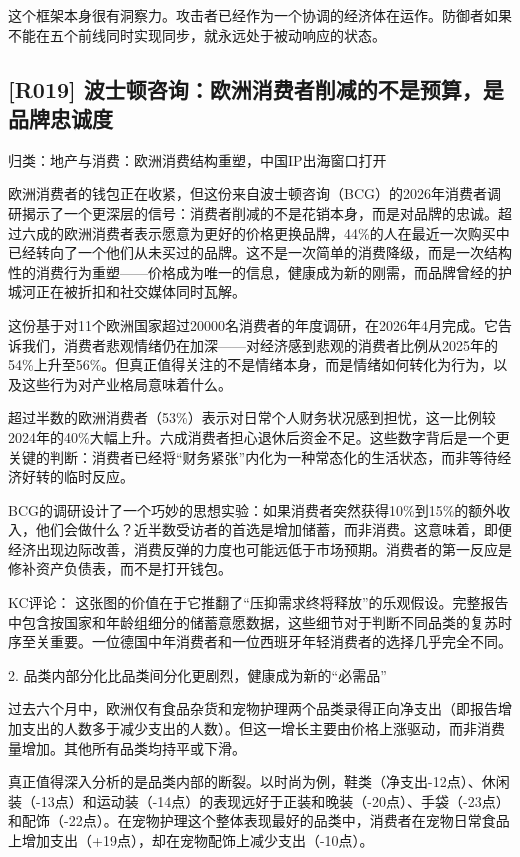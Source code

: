 \documentclass[11pt]{ctexart}
\begin{document}
这个框架本身很有洞察力。攻击者已经作为一个协调的经济体在运作。防御者如果不能在五个前线同时实现同步，就永远处于被动响应的状态。

\subsection{[R019] 波士顿咨询：欧洲消费者削减的不是预算，是品牌忠诚度}
{\small\color{refgray}归类：地产与消费：欧洲消费结构重塑，中国IP出海窗口打开}

欧洲消费者的钱包正在收紧，但这份来自波士顿咨询（BCG）的2026年消费者调研揭示了一个更深层的信号：消费者削减的不是花销本身，而是对品牌的忠诚。超过六成的欧洲消费者表示愿意为更好的价格更换品牌，44\%的人在最近一次购买中已经转向了一个他们从未买过的品牌。这不是一次简单的消费降级，而是一次结构性的消费行为重塑——价格成为唯一的信息，健康成为新的刚需，而品牌曾经的护城河正在被折扣和社交媒体同时瓦解。

这份基于对11个欧洲国家超过20000名消费者的年度调研，在2026年4月完成。它告诉我们，消费者悲观情绪仍在加深——对经济感到悲观的消费者比例从2025年的54\%上升至56\%。但真正值得关注的不是情绪本身，而是情绪如何转化为行为，以及这些行为对产业格局意味着什么。

超过半数的欧洲消费者（53\%）表示对日常个人财务状况感到担忧，这一比例较2024年的40\%大幅上升。六成消费者担心退休后资金不足。这些数字背后是一个更关键的判断：消费者已经将“财务紧张”内化为一种常态化的生活状态，而非等待经济好转的临时反应。

BCG的调研设计了一个巧妙的思想实验：如果消费者突然获得10\%到15\%的额外收入，他们会做什么？近半数受访者的首选是增加储蓄，而非消费。这意味着，即便经济出现边际改善，消费反弹的力度也可能远低于市场预期。消费者的第一反应是修补资产负债表，而不是打开钱包。

KC评论： 这张图的价值在于它推翻了“压抑需求终将释放”的乐观假设。完整报告中包含按国家和年龄组细分的储蓄意愿数据，这些细节对于判断不同品类的复苏时序至关重要。一位德国中年消费者和一位西班牙年轻消费者的选择几乎完全不同。

2. 品类内部分化比品类间分化更剧烈，健康成为新的“必需品”

过去六个月中，欧洲仅有食品杂货和宠物护理两个品类录得正向净支出（即报告增加支出的人数多于减少支出的人数）。但这一增长主要由价格上涨驱动，而非消费量增加。其他所有品类均持平或下滑。

真正值得深入分析的是品类内部的断裂。以时尚为例，鞋类（净支出-12点）、休闲装（-13点）和运动装（-14点）的表现远好于正装和晚装（-20点）、手袋（-23点）和配饰（-22点）。在宠物护理这个整体表现最好的品类中，消费者在宠物日常食品上增加支出（+19点），却在宠物配饰上减少支出（-10点）。
\end{document}
